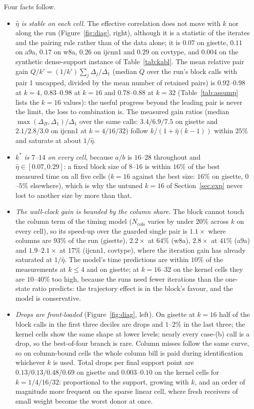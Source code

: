 Four facts follow.
\begin{itemize}\setlength\itemsep{0pt}
\item \emph{$\hat\eta$ is stable on each cell.} The effective
correlation does not move with $k$ nor along the run
(Figure~\ref{fig:diag}, right), although it is a statistic of the
iterates and the pairing rule rather than of the data alone; it is $0.07$ on
gisette, $0.11$ on a9a, $0.17$ on w8a, $0.26$ on ijcnn1 and $0.29$ on
covtype, and $0.004$ on the synthetic dense-support instance of
Table~\ref{tab:kabl}. The mean relative pair gain
$Q/k'=(1/k')\sum_j\Delta_j/\Delta_1$ (median $Q$ over the run's block
calls with pair 1 uncapped, divided by the mean number of retained
pairs) is $0.92$--$0.98$ at $k=4$, $0.83$--$0.98$ at $k=16$ and
$0.78$--$0.88$ at $k=32$ (Table~\ref{tab:assump} lists the $k=16$
values): the useful progress beyond the leading pair is never the
limit, the loss to combination is. The measured gain ratios (median
$\max(\Delta_B,\Delta_1)/\Delta_1$ over the same calls: $3.4/6.9/7.5$ on
gisette and $2.1/2.8/3.0$ on ijcnn1 at $k=4/16/32$) follow
$k/(1+\hat\eta(k-1))$ within $25\%$ and saturate at about $1/\hat\eta$.
\item \emph{$k^*$ is $7$--$14$ on every cell}, because $a/b$ is
$16$--$28$ throughout and $\hat\eta\in[0.07,0.29]$: a fixed block size
of $8$--$16$ is within $16\%$ of the best measured time on all five
cells ($k{=}16$ against the best size: $16\%$ on gisette, $0$--$5\%$
elsewhere), which is why the untuned $k=16$ of Section~\ref{sec:exp}
never lost to another size by more than that.
\item \emph{The wall-clock gain is bounded by the column share.} The
block cannot touch the column term of the timing model
($N_{\mathrm{cols}}$ varies by under $20\%$ across $k$ on every cell),
so its speed-up over the guarded single pair is $1.1\times$ where columns
are $93\%$ of the run (gisette), $2.2\times$ at $64\%$ (w8a),
$2.8\times$ at $41\%$ (a9a) and $1.9$--$2.1\times$ at $17\%$ (ijcnn1,
covtype), where the iteration gain has already saturated at $1/\hat\eta$.
The model's time predictions are within $10\%$ of the measurements at
$k\le4$ and on gisette; at $k=16$--$32$ on the kernel cells they are
$10$--$40\%$ too high, because the runs need fewer iterations than the
one-state ratio predicts: the trajectory effect is in the block's
favour, and the model is conservative.
\item \emph{Drops are front-loaded} (Figure~\ref{fig:diag}, left). On
gisette at $k=16$ half of the block calls in the first three deciles are
drops and $1$--$2\%$ in the last three; the kernel cells show the same
shape at lower levels; nearly every case-(b) call is a drop, so the
best-of-four branch is rare. Column misses follow the same curve, so on
column-bound cells the whole column bill is paid during identification
whichever $k$ is used. Total drops per final support point are
$0.13/0.13/0.48/0.69$ on gisette and $0.003$--$0.10$ on the kernel cells
for $k=1/4/16/32$: proportional to the support, growing with $k$, and an
order of magnitude more frequent on the sparse linear cell, where fresh
receivers of small weight become the worst donor at once.
\end{itemize}
